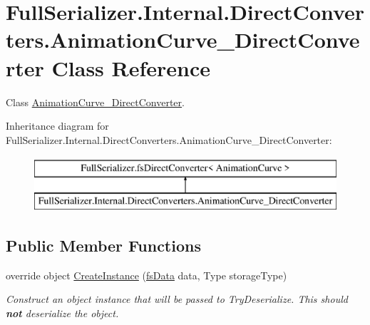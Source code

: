 \hypertarget{class_full_serializer_1_1_internal_1_1_direct_converters_1_1_animation_curve___direct_converter}{}\section{Full\+Serializer.\+Internal.\+Direct\+Converters.\+Animation\+Curve\+\_\+\+Direct\+Converter Class Reference}
\label{class_full_serializer_1_1_internal_1_1_direct_converters_1_1_animation_curve___direct_converter}


Class \hyperlink{class_full_serializer_1_1_internal_1_1_direct_converters_1_1_animation_curve___direct_converter}{Animation\+Curve\+\_\+\+Direct\+Converter}.  


Inheritance diagram for Full\+Serializer.\+Internal.\+Direct\+Converters.\+Animation\+Curve\+\_\+\+Direct\+Converter\+:\begin{figure}[H]
\begin{center}
\leavevmode
\includegraphics[height=2.000000cm]{class_full_serializer_1_1_internal_1_1_direct_converters_1_1_animation_curve___direct_converter}
\end{center}
\end{figure}
\subsection*{Public Member Functions}
\begin{DoxyCompactItemize}
\item 
override object \hyperlink{class_full_serializer_1_1_internal_1_1_direct_converters_1_1_animation_curve___direct_converter_ade5d37cdc1d926982bc5523d3745cfb7}{Create\+Instance} (\hyperlink{class_full_serializer_1_1fs_data}{fs\+Data} data, Type storage\+Type)
\begin{DoxyCompactList}\small\item\em Construct an object instance that will be passed to Try\+Deserialize. This should {\bfseries not} deserialize the object. \end{DoxyCompactList}\end{DoxyCompactItemize}
